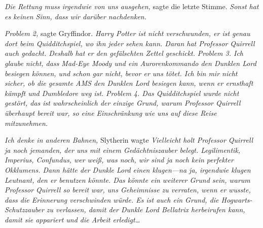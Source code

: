 \emph{Die Rettung muss irgendwie von uns ausgehen,} sagte die letzte Stimme. \emph{Sonst hat es keinen Sinn, dass wir darüber nachdenken.}

\emph{Problem 2,} sagte Gryffindor. \emph{Harry Potter ist nicht verschwunden, er ist genau dort beim Quidditchspiel, wo ihn jeder sehen kann. Daran hat Professor Quirrell auch gedacht. Deshalb hat er den gefälschten Zettel geschickt.}
\emph{Problem 3. Ich glaube nicht, dass Mad-Eye Moody und ein Aurorenkommando den Dunklen Lord besiegen können, und schon gar nicht, bevor er uns tötet. Ich bin mir nicht sicher, ob die gesamte AMS den Dunklen Lord besiegen kann, wenn er ernsthaft kämpft und Dumbledore weg ist.}
\emph{Problem 4. Das Quidditchspiel wurde nicht gestört, das ist wahrscheinlich der einzige Grund, warum Professor Quirrell überhaupt bereit war, so eine Einschränkung wie uns auf diese Reise mitzunehmen.}

\emph{Ich denke in anderen Bahnen,} Slytherin wagte \emph{Vielleicht holt Professor Quirrell ja noch jemanden, der uns mit einem Gedächtniszauber belegt. Legilimentik, Imperius, Confundus, wer weiß, was noch, wir sind ja noch kein perfekter Okklumens. Dann hätte der Dunkle Lord einen klugen—na ja, irgendwie klugen Leutnant, den er benutzen könnte. Das könnte ein weiterer Grund sein, warum Professor Quirrell so bereit war, uns Geheimnisse zu verraten, wenn er wusste, dass die Erinnerung verschwinden würde. Es ist auch ein Grund, die Hogwarts-Schutzzauber zu verlassen, damit der Dunkle Lord Bellatrix herbeirufen kann, damit sie appariert und die Arbeit erledigt…}

